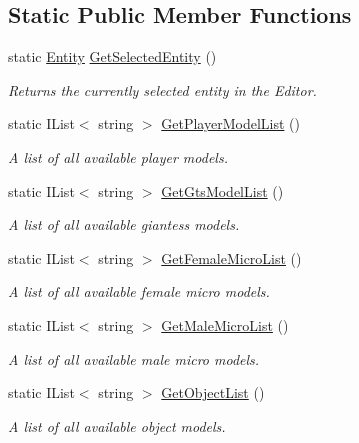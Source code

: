 \subsection*{Static Public Member Functions}
\begin{DoxyCompactItemize}
\item 
static \mbox{\hyperlink{class_lua_1_1_entity}{Entity}} \mbox{\hyperlink{class_lua_1_1_entity_af3f7aae31ecb691380a6f18f053fb907}{Get\+Selected\+Entity}} ()
\begin{DoxyCompactList}\small\item\em Returns the currently selected entity in the Editor. \end{DoxyCompactList}\item 
static I\+List$<$ string $>$ \mbox{\hyperlink{class_lua_1_1_entity_abf1acc0c0ad6baa7224c8f3e088caf0f}{Get\+Player\+Model\+List}} ()
\begin{DoxyCompactList}\small\item\em A list of all available player models. \end{DoxyCompactList}\item 
static I\+List$<$ string $>$ \mbox{\hyperlink{class_lua_1_1_entity_a8abff3f32d1cbaa6355d4d217ab558e1}{Get\+Gts\+Model\+List}} ()
\begin{DoxyCompactList}\small\item\em A list of all available giantess models. \end{DoxyCompactList}\item 
static I\+List$<$ string $>$ \mbox{\hyperlink{class_lua_1_1_entity_a42f84cbad068689f4308f5e4b1c7a981}{Get\+Female\+Micro\+List}} ()
\begin{DoxyCompactList}\small\item\em A list of all available female micro models. \end{DoxyCompactList}\item 
static I\+List$<$ string $>$ \mbox{\hyperlink{class_lua_1_1_entity_a7d49be266385d4155691a2349d964b81}{Get\+Male\+Micro\+List}} ()
\begin{DoxyCompactList}\small\item\em A list of all available male micro models. \end{DoxyCompactList}\item 
static I\+List$<$ string $>$ \mbox{\hyperlink{class_lua_1_1_entity_aacd0f73c8377462b354deb3bc73c6b40}{Get\+Object\+List}} ()
\begin{DoxyCompactList}\small\item\em A list of all available object models. \end{DoxyCompactList}\item 

\end{DoxyCompactItemize}
